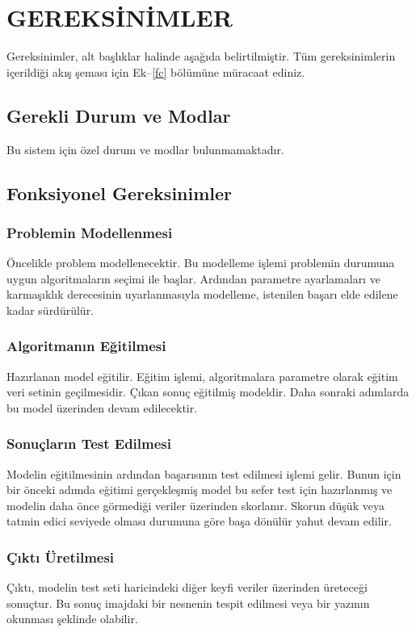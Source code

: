 \documentclass[12pt,a4paper]{article}
\begin{document}
   \section{GEREKSİNİMLER}
   Gereksinimler, alt başlıklar halinde aşağıda belirtilmiştir. Tüm gereksinimlerin içerildiği akış şeması için Ek--\ref{fc} bölümüne müracaat ediniz.

   \subsection{Gerekli Durum ve Modlar}
   Bu sistem için özel durum ve modlar bulunmamaktadır.

   \subsection{Fonksiyonel Gereksinimler} \label{ger}

   \subsubsection{Problemin Modellenmesi}
   Öncelikle problem modellenecektir. Bu modelleme işlemi problemin durumuna uygun algoritmaların seçimi ile başlar. Ardından parametre ayarlamaları ve karmaşıklık derecesinin uyarlanmasıyla modelleme, istenilen başarı elde edilene kadar sürdürülür.

   \subsubsection{Algoritmanın Eğitilmesi}
   Hazırlanan model eğitilir. Eğitim işlemi, algoritmalara parametre olarak eğitim veri setinin geçilmesidir. Çıkan sonuç eğitilmiş modeldir. Daha sonraki adımlarda bu model üzerinden devam edilecektir.

   \subsubsection{Sonuçların Test Edilmesi}
   Modelin eğitilmesinin ardından başarısının test edilmesi işlemi gelir. Bunun için bir önceki adımda eğitimi gerçekleşmiş model bu sefer test için hazırlanmış ve modelin daha önce görmediği veriler üzerinden skorlanır. Skorun düşük veya tatmin edici seviyede olması durumuna göre başa dönülür yahut devam edilir.

   \subsubsection{Çıktı Üretilmesi}
   Çıktı, modelin test seti haricindeki diğer keyfi veriler üzerinden üreteceği sonuçtur. Bu sonuç imajdaki bir nesnenin tespit edilmesi veya bir yazının okunması şeklinde olabilir.
\end{document}
